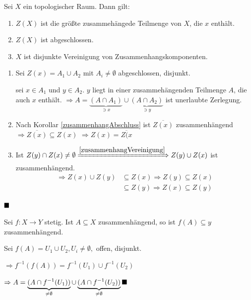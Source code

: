 \begin{korollar}
    Sei $X$ ein topologischer Raum. Dann gilt:
    \begin{enumerate}[label=\alph*)]
        \item $Z(X)$ ist die größte zusammehängede Teilmenge von $X$,
              die $x$ enthält.
        \item $Z(X)$ ist abgeschlossen.
        \item $X$ ist disjunkte Vereinigung von Zusammenhangskomponenten.
    \end{enumerate}
\end{korollar}

\begin{beweis}\leavevmode
    \begin{enumerate}[label=\alph*)]
        \item Sei $Z(x) = A_1 \cup A_2$ mit $A_i \neq \emptyset$ abgeschlossen,
              disjunkt.

            \Obda sei $x \in A_1$ und $y \in A_2$. $y$ liegt in einer zusammehängenden
            Teilmenge $A$, die auch $x$ enthält.
            $\Rightarrow A = \underbrace{(A \cap A_1)}_{\ni x} \cup \underbrace{(A \cap A_2)}_{\ni y}$
            ist unerlaubte Zerlegung.
        \item Nach Korollar \ref{zusammenhangAbschluss} ist $\overline{Z(x)}$
              zusammenhängend $\Rightarrow \overline{Z(x)} \subseteq Z(x)$
              $\Rightarrow Z(x) = \overline{Z(x}$
        \item Ist $Z(y) \cap Z(x) \neq \emptyset \xRightarrow{\ref{zusammenhangVereinigung}} Z(y) \cup Z(x)$
              ist zusammenhängend. \\
              \begin{align*}
                \Rightarrow Z(x) \cup Z(y) &\subseteq Z(x) \Rightarrow Z(y) \subseteq Z(x)\\
                                           &\subseteq Z(y) \Rightarrow Z(x) \subseteq Z(y)
              \end{align*} 
    \end{enumerate}

    $\qed$
\end{beweis}

\begin{korollar}
    Sei $f:X \rightarrow Y$ stetig. Ist $A \subseteq X$ zusammenhängend,
    so ist $f(A) \subseteq y$ zusammenhängend.
\end{korollar}

\begin{beweis}
    Sei $f(A) = U_1 \cup U_2, U_i \neq \emptyset,$ offen, disjunkt.

    $\Rightarrow f^{-1} (f(A)) = f^{-1}(U_1) \cup f^{-1}(U_2)$

    $\Rightarrow A = \underbrace{(A \cap f^{-1}(U_1))}_{\neq \emptyset} \cup \underbrace{(A \cap f^{-1}(U_2))}_{\neq \emptyset} \qed$
\end{beweis}

